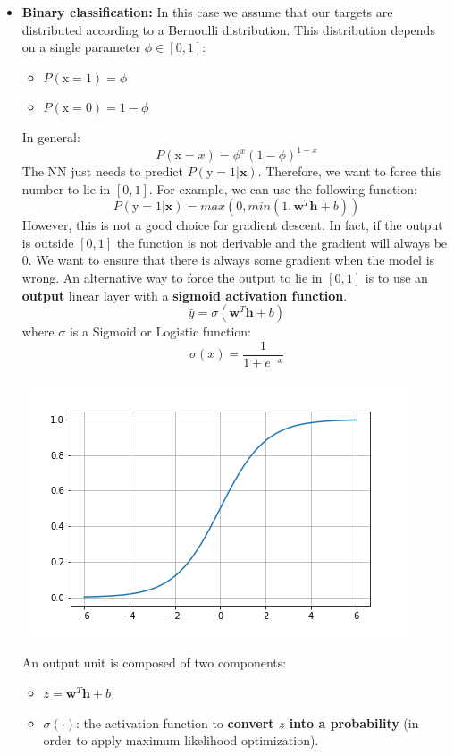 \begin{itemize}
    \item \textbf{Binary classification:} In this case we assume that our targets are distributed according to a Bernoulli distribution. This distribution depends on a single parameter $\phi \in [0, 1]$:
    \begin{itemize}
        \item $P(\text{x} = 1) = \phi$
        \item $P(\text{x} = 0) = 1 - \phi$
    \end{itemize}
    In general:
    \[P(\text{x} = x) = \phi^{x}(1 - \phi)^{1-x}\]
    The NN just needs to predict $P(\text{y} = 1 | \textbf{x})$. Therefore, we want to force this number to lie in $[0, 1]$. For example, we can use the following function:
    \[P(\text{y} = 1|\textbf{x}) = max(0, min(1, \textbf{w}^{T}\textbf{h} + b))\]
    However, this is not a good choice for gradient descent. In fact, if the output is outside $[0, 1]$ the function is not derivable and the gradient will always be 0. We want to ensure that there is always some gradient when the model is wrong. An alternative way to force the output to lie in $[0, 1]$ is to use an \textbf{output} linear layer with a \textbf{sigmoid activation function}.
    \[\hat{y} = \sigma(\textbf{w}^{T}\textbf{h} + b)\]
    where $\sigma$ is a Sigmoid or Logistic function:
    \[\sigma(x) = \frac{1}{1 + e^{-x}}\]
    \begin{center}
        \includegraphics[scale = 0.5]{images/sigmoid.png}
    \end{center}
    An output unit is composed of two components:
    \begin{itemize}
        \item $z = \textbf{w}^{T}\textbf{h} + b$
        \item $\sigma(\cdot)$: the activation function to \textbf{convert $z$ into a probability} (in order to apply maximum likelihood optimization).

\end{itemize}
\end{itemize}

